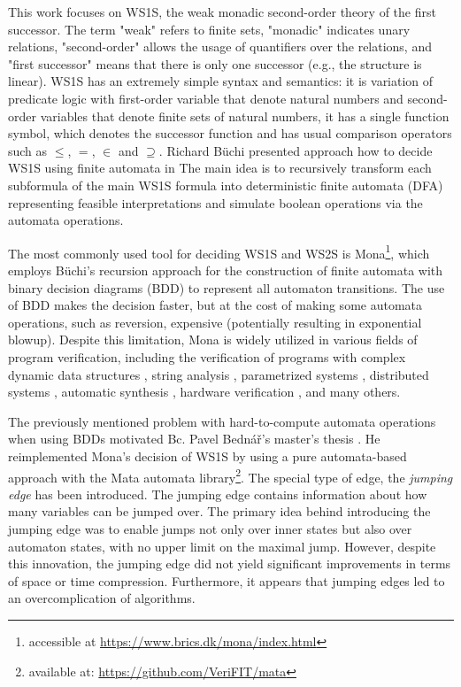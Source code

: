 \documentclass[pdflatex,sn-mathphys-num]{sn-jnl}%
\theoremstyle{thmstyleone}%
\theoremstyle{thmstyletwo}%
\theoremstyle{thmstylethree}%
\begin{document}
    This work focuses on WS1S, the weak monadic second-order theory of the first successor. The term "weak" refers to finite sets, "monadic" indicates unary relations, "second-order" allows the usage of quantifiers over the relations, and "first successor" means that there is only one successor (e.g., the structure is linear).  WS1S \cite{WS1S} has an extremely simple syntax and semantics: it is variation of predicate logic with first-order variable that denote natural numbers and second-order variables that denote finite sets of natural numbers, it has a single function symbol, which denotes the successor function and has usual comparison operators such as $\leq$, $=$, $\in$ and $\supseteq$. Richard Büchi presented approach how to decide WS1S using finite automata in \cite{Buchi} The main idea is to recursively transform each subformula of the main WS1S formula into deterministic finite automata (DFA) representing feasible interpretations and simulate boolean operations via the automata operations.

    The most commonly used tool for deciding WS1S and WS2S is Mona\footnote{accessible at \url{https://www.brics.dk/mona/index.html}}, which employs Büchi's recursion approach for the construction of finite automata with binary decision diagrams (BDD) to represent all automaton transitions. The use of BDD makes the decision faster, but at the cost of making some automata operations, such as reversion, expensive (potentially resulting in exponential blowup). Despite this limitation, Mona is widely utilized in various fields of program verification, including the verification of programs with complex dynamic data structures \cite{DDS1, DDS2}, string analysis \cite{string_analysis}, parametrized systems \cite{parametrized_systems}, distributed systems \cite{distributed_systems}, automatic synthesis \cite{automatic_synthesis}, hardware verification \cite{hardware_verification}, and many others.

    The previously mentioned problem with hard-to-compute automata operations when using BDDs motivated Bc. Pavel Bednář's master's thesis \cite{Bednar}. He reimplemented Mona's decision of WS1S by using a pure automata-based approach with the Mata automata library\footnote{available at: \url{https://github.com/VeriFIT/mata}}. The special type of edge, the \textit{jumping edge} has been introduced. The jumping edge contains information about how many variables can be jumped over. The primary idea behind introducing the jumping edge was to enable jumps not only over inner states but also over automaton states, with no upper limit on the maximal jump. However, despite this innovation, the jumping edge did not yield significant improvements in terms of space or time compression. Furthermore, it appears that jumping edges led to an overcomplication of algorithms.
\end{document}
